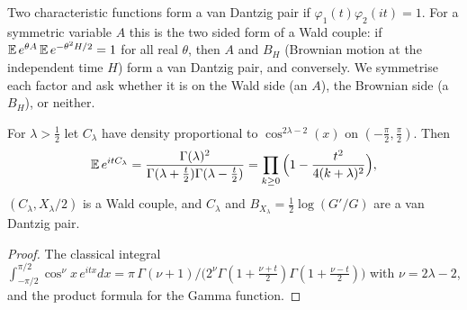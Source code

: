 Two characteristic functions form a van Dantzig pair if $\varphi_1(t)\varphi_2(it)=1$. For a symmetric variable $A$ this is the two sided form of a Wald couple: if $\mathbb{E}\,e^{\theta A}\,\mathbb{E}\,e^{-\theta^2H/2}=1$ for all real $\theta$, then $A$ and $B_H$ (Brownian motion at the independent time $H$) form a van Dantzig pair, and conversely. We symmetrise each factor and ask whether it is on the Wald side (an $A$), the Brownian side (a $B_H$), or neither.

\begin{proposition}[proved]\label{nf:prop:gamma}
For $\lambda>\frac12$ let $C_\lambda$ have density proportional to $\cos^{2\lambda-2}(x)$ on $(-\frac\pi2,\frac\pi2)$. Then
\[
\mathbb{E}\,e^{itC_\lambda}=\frac{\Gamma(\lambda)^2}{\Gamma(\lambda+\frac t2)\Gamma(\lambda-\frac t2)}=\prod_{k\ge0}\Big(1-\frac{t^2}{4(k+\lambda)^2}\Big),
\]
$(C_\lambda,X_\lambda/2)$ is a Wald couple, and $C_\lambda$ and $B_{X_\lambda}=\frac12\log(G'/G)$ are a van Dantzig pair.
\end{proposition}

\begin{proof}
The classical integral $\int_{-\pi/2}^{\pi/2}\cos^\nu x\,e^{itx}dx=\pi\,\Gamma(\nu+1)\big/\big(2^\nu\Gamma(1+\frac{\nu+t}2)\Gamma(1+\frac{\nu-t}2)\big)$ with $\nu=2\lambda-2$, and the product formula for the Gamma function.
\end{proof}


